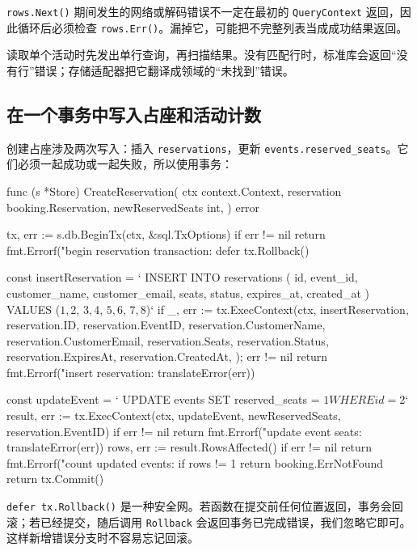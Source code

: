 \texttt{rows.Next()} 期间发生的网络或解码错误不一定在最初的 \texttt{QueryContext} 返回，因此循环后必须检查 \texttt{rows.Err()}。漏掉它，可能把不完整列表当成成功结果返回。

读取单个活动时先发出单行查询，再扫描结果。没有匹配行时，标准库会返回“没有行”错误；存储适配器把它翻译成领域的“未找到”错误。

\subsection{在一个事务中写入占座和活动计数}

创建占座涉及两次写入：插入 \texttt{reservations}，更新 \texttt{events.reserved\_seats}。它们必须一起成功或一起失败，所以使用事务：

\begin{gocode}[title={代码清单 12.44 \texttt{reservations.go}：第一版占座事务}]
func (s *Store) CreateReservation(
    ctx context.Context,
    reservation booking.Reservation,
    newReservedSeats int,
) error {
    tx, err := s.db.BeginTx(ctx, &sql.TxOptions{})
    if err != nil {
        return fmt.Errorf("begin reservation transaction: %
    }
    defer tx.Rollback()

    const insertReservation = `
        INSERT INTO reservations (
            id, event_id, customer_name, customer_email,
            seats, status, expires_at, created_at
        ) VALUES ($1, $2, $3, $4, $5, $6, $7, $8)`
    if _, err := tx.ExecContext(ctx, insertReservation,
        reservation.ID, reservation.EventID,
        reservation.CustomerName, reservation.CustomerEmail,
        reservation.Seats, reservation.Status,
        reservation.ExpiresAt, reservation.CreatedAt,
    ); err != nil {
        return fmt.Errorf("insert reservation: %
            translateError(err))
    }

    const updateEvent = `
        UPDATE events
        SET reserved_seats = $1
        WHERE id = $2`
    result, err := tx.ExecContext(ctx, updateEvent,
        newReservedSeats, reservation.EventID)
    if err != nil {
        return fmt.Errorf("update event seats: %
            translateError(err))
    }
    rows, err := result.RowsAffected()
    if err != nil {
        return fmt.Errorf("count updated events: %
    }
    if rows != 1 {
        return booking.ErrNotFound
    }
    return tx.Commit()
}
\end{gocode}

\texttt{defer tx.Rollback()} 是一种安全网。若函数在提交前任何位置返回，事务会回滚；若已经提交，随后调用 \texttt{Rollback} 会返回事务已完成错误，我们忽略它即可。这样新增错误分支时不容易忘记回滚。

